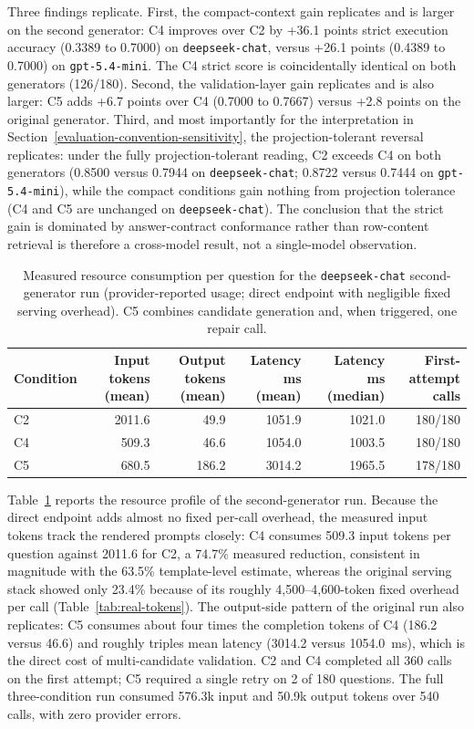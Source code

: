 \documentclass{ieeeaccess}
\begin{document}
Three findings replicate. First, the compact-context gain replicates and is larger on the second generator: C4 improves over C2 by +36.1 points strict execution accuracy (0.3389 to 0.7000) on \texttt{deepseek-chat}, versus +26.1 points (0.4389 to 0.7000) on \texttt{gpt-5.4-mini}. The C4 strict score is coincidentally identical on both generators (126/180). Second, the validation-layer gain replicates and is also larger: C5 adds +6.7 points over C4 (0.7000 to 0.7667) versus +2.8 points on the original generator. Third, and most importantly for the interpretation in Section~\ref{evaluation-convention-sensitivity}, the projection-tolerant reversal replicates: under the fully projection-tolerant reading, C2 exceeds C4 on both generators (0.8500 versus 0.7944 on \texttt{deepseek-chat}; 0.8722 versus 0.7444 on \texttt{gpt-5.4-mini}), while the compact conditions gain nothing from projection tolerance (C4 and C5 are unchanged on \texttt{deepseek-chat}). The conclusion that the strict gain is dominated by answer-contract conformance rather than row-content retrieval is therefore a cross-model result, not a single-model observation.

\begin{table}[t]
\caption{Measured resource consumption per question for the \texttt{deepseek-chat} second-generator run (provider-reported usage; direct endpoint with negligible fixed serving overhead). C5 combines candidate generation and, when triggered, one repair call.}
\label{tab:deepseek-tokens}
\centering
\small
\begin{tabular*}{\textwidth}{@{\extracolsep{\fill}}lrrrrr}
\toprule
Condition & Input tokens (mean) & Output tokens (mean) & Latency ms (mean) & Latency ms (median) & First-attempt calls \\
\midrule
C2 & 2011.6 & 49.9 & 1051.9 & 1021.0 & 180/180 \\
C4 & 509.3 & 46.6 & 1054.0 & 1003.5 & 180/180 \\
C5 & 680.5 & 186.2 & 3014.2 & 1965.5 & 178/180 \\
\bottomrule
\end{tabular*}
\end{table}

Table~\ref{tab:deepseek-tokens} reports the resource profile of the second-generator run. Because the direct endpoint adds almost no fixed per-call overhead, the measured input tokens track the rendered prompts closely: C4 consumes 509.3 input tokens per question against 2011.6 for C2, a 74.7\% measured reduction, consistent in magnitude with the 63.5\% template-level estimate, whereas the original serving stack showed only 23.4\% because of its roughly 4{,}500--4{,}600-token fixed overhead per call (Table~\ref{tab:real-tokens}). The output-side pattern of the original run also replicates: C5 consumes about four times the completion tokens of C4 (186.2 versus 46.6) and roughly triples mean latency (3014.2 versus 1054.0~ms), which is the direct cost of multi-candidate validation. C2 and C4 completed all 360 calls on the first attempt; C5 required a single retry on 2 of 180 questions. The full three-condition run consumed 576.3k input and 50.9k output tokens over 540 calls, with zero provider errors.
\end{document}
